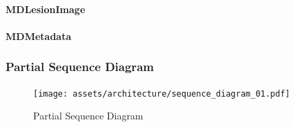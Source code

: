         \paragraph{MDLesionImage}
            
        \paragraph{MDMetadata}
            

    \subsubsection{Partial Sequence Diagram }

        \begin{figure}[H]
            \centering
            \texttt{[image: assets/architecture/sequence\_diagram\_01.pdf]}
            \caption{Partial Sequence Diagram}
            \label{fig:seq_dia}
        \end{figure}
